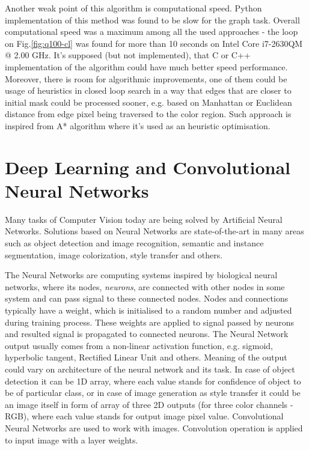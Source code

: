 \documentclass{ctuthesis}
\begin{document}
Another weak point of this algorithm is computational speed. Python implementation of this method was found to be slow for the graph task. Overall computational speed was a maximum among all the used approaches - the loop on Fig.\ref{fig:q100-cl} was found for more than 10 seconds on Intel Core i7-2630QM @ 2.00 GHz. It's supposed (but not implemented), that C or C++ implementation of the algorithm could have much better speed performance. Moreover, there is room for algorithmic improvements, one of them could be usage of heuristics in closed loop search in a way that edges that are closer to initial mask could be processed sooner, e.g. based on Manhattan or Euclidean distance from edge pixel being traversed to the color region. Such approach is inspired from A* algorithm \cite{astar} where it's used as an heuristic optimisation.

\section{Deep Learning and Convolutional Neural Networks}

Many tasks of Computer Vision today are being solved by Artificial Neural Networks. Solutions based on Neural Networks are state-of-the-art in many areas such as object detection and image recognition, semantic and instance segmentation, image colorization, style transfer and others.

The Neural Networks are computing systems inspired by biological neural networks, where its nodes, \emph{neurons}, are connected with other nodes in some system and can pass signal to these connected nodes. Nodes and connections typically have a weight, which is initialised to a random number and adjusted during training process. These weights are applied to signal passed by neurons and resulted signal is propagated to connected neurons. The Neural Network output usually comes from a non-linear activation function, e.g. sigmoid, hyperbolic tangent, Rectified Linear Unit and others. Meaning of the output could vary on architecture of the neural network and its task. In case of object detection it can be 1D array, where each value stands for confidence of object to be of particular class, or in case of image generation as style transfer it could be an image itself in form of array of three 2D outputs (for three color channels - RGB), where each value stands for output image pixel value. Convolutional Neural Networks are used to work with images. Convolution operation is applied to input image with a layer weights.
\end{document}
